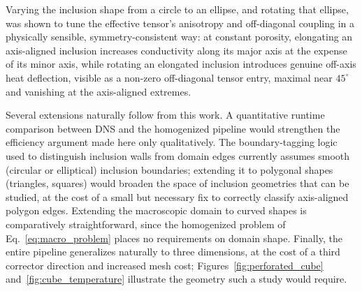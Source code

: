 \documentclass{article}
\begin{document}
Varying the inclusion shape from a circle to an ellipse, and rotating that
ellipse, was shown to tune the effective tensor's anisotropy and off-diagonal
coupling in a physically sensible, symmetry-consistent way: at constant
porosity, elongating an axis-aligned inclusion increases conductivity along
its major axis at the expense of its minor axis, while rotating an elongated
inclusion introduces genuine off-axis heat deflection, visible as a non-zero
off-diagonal tensor entry, maximal near $45^{\circ}$ and vanishing at the
axis-aligned extremes.

Several extensions naturally follow from this work. A quantitative runtime
comparison between DNS and the homogenized pipeline would strengthen the
efficiency argument made here only qualitatively. The boundary-tagging logic
used to distinguish inclusion walls from domain edges currently assumes
smooth (circular or elliptical) inclusion boundaries; extending it to
polygonal shapes (triangles, squares) would broaden the space of
inclusion geometries that can be studied, at the cost of a small but
necessary fix to correctly classify axis-aligned polygon edges. Extending
the macroscopic domain to curved shapes is comparatively straightforward,
since the homogenized problem of Eq.~\eqref{eq:macro_problem} places no
requirements on domain shape. Finally, the entire pipeline generalizes
naturally to three dimensions, at the cost of a third corrector direction
and increased mesh cost; Figures~\ref{fig:perforated_cube}
and~\ref{fig:cube_temperature} illustrate the geometry such a study would
require.

\listoffigures
\end{document}

